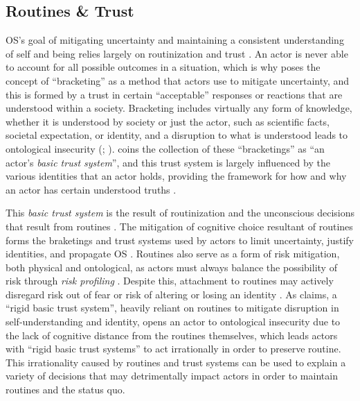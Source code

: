 \subsection{Routines \& Trust}
\label{subsec:rountine}

\ac{OS}'s goal of mitigating uncertainty and maintaining a consistent understanding of self and being relies largely on routinization and trust \citep[pg.~346]{mitzenOntologicalSecurityWorld2006}. An actor is never able to account for all possible outcomes in a situation, which is why \citet[pg.~36-37]{giddens1991} poses the concept of ``bracketing'' as a method that actors use to mitigate uncertainty, and this is formed by a trust in certain ``acceptable'' responses or reactions that are understood within a society. Bracketing includes virtually any form of knowledge, whether it is understood by society or just the actor, such as scientific facts, societal expectation, or identity, and a disruption to what is understood leads to ontological insecurity (\citealp[pg.~37-38]{giddens1991}; \citealp[pg.~346-347]{mitzenOntologicalSecurityWorld2006}). \citet[pg.~346]{mitzenOntologicalSecurityWorld2006} coins the collection of these ``bracketings'' as ``an actor's \textit{basic trust system}'', and this trust system is largely influenced by the various identities that an actor holds, providing the framework for how and why an actor has certain understood truths \citep[pg.~37-40]{giddens1991}.

This \textit{basic trust system} is the result of routinization and the unconscious decisions that result from routines \citep[pg.~346-347]{mitzenOntologicalSecurityWorld2006}. The mitigation of cognitive choice resultant of routines forms the braketings and trust systems used by actors to limit uncertainty, justify identities, and propagate \ac{OS} \citep[]{mitzenOntologicalSecurityWorld2006}. Routines also serve as a form of risk mitigation, both physical and ontological, as actors must always balance the possibility of risk through \textit{risk profiling} \citep[pg.~127-130]{giddens1991}. Despite this, attachment to routines may actively disregard risk out of fear or risk of altering or losing an identity \citep[pg.~347]{mitzenOntologicalSecurityWorld2006}. As \citet[pg.~350-351]{mitzenOntologicalSecurityWorld2006} claims, a ``rigid basic trust system'', heavily reliant on routines to mitigate disruption in self-understanding and identity, opens an actor to ontological insecurity due to the lack of cognitive distance from the routines themselves, which leads actors with ``rigid basic trust systems'' to act irrationally in order to preserve routine. This irrationality caused by routines and trust systems can be used to explain a variety of decisions that may detrimentally impact actors in order to maintain routines and the status quo.


